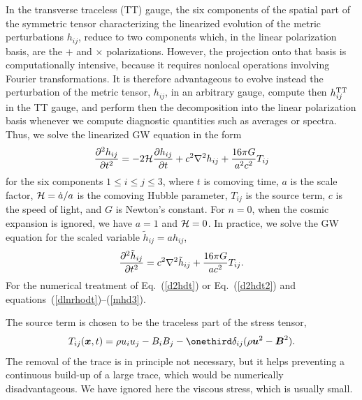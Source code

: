 \documentclass[\mydriver,12pt,twoside,notitlepage,a4paper]{article}
\renewcommand{\vec}[1]{\mbox{\boldmath{$#1$}}}
\newcommand{\Bv}            {\vec{B}}
\newcommand{\uv}            {\vec{u}}
\newcommand{\xv}            {\vec{x}}
\newcommand{\Eq}[1]{Eq.~(\ref{#1})}
\begin{document}
In the transverse traceless (TT) gauge, the six components of the
spatial part of the symmetric tensor characterizing the linearized
evolution of the metric perturbations $h_{ij}$,
reduce to two components which, in the linear polarization
basis, are the $+$ and $\times$ polarizations.
However, the projection onto that basis is computationally intensive,
because it requires nonlocal operations involving Fourier transformations.
It is therefore advantageous to evolve instead the perturbation of the metric
tensor, $h_{ij}$, in an arbitrary gauge, compute then $h_{ij}^{\rm TT}$ in
the TT gauge, and perform then the decomposition into the linear polarization
basis whenever we compute diagnostic quantities such as averages or spectra.
Thus, we solve the linearized GW equation in the form \cite{Dur08}
\begin{equation}
{\partial^2h_{ij}\over\partial t^2}
=-2{\cal H}{\partial h_{ij}\over\partial t}
+c^2\nabla^2h_{ij}+{16\pi G\over a^2 c^2} T_{ij}
\label{d2hdt}
\end{equation}
for the six components $1\leq i\leq j\leq3$, where $t$ is comoving time,
$a$ is the scale factor, ${\cal H}=\dot{a}/a$ is the comoving Hubble
parameter, $T_{ij}$ is the source term, $c$ is the speed of light,
and $G$ is Newton's constant.
For $n=0$, when the cosmic expansion is ignored, we have $a=1$ and
${\cal H}=0$.
In practice, we solve the GW equation for the scaled variable
$\tilde{h}_{ij}=ah_{ij}$,
\begin{equation}
{\partial^2\tilde{h}_{ij}\over\partial t^2}
=c^2\nabla^2\tilde{h}_{ij}+{16\pi G\over a c^2} T_{ij}.
\label{d2hdt2}
\end{equation}
For the numerical treatment of \Eq{d2hdt} or \Eq{d2hdt2} and
equations~(\ref{dlnrhodt})--(\ref{mhd3}).

The source term is chosen to be the traceless part of the stress tensor,
\begin{equation}
T_{ij}(\xv,t)=\rho u_i u_j - B_i B_j
- \onethird\delta_{ij}(\rho\uv^2-\Bv^2).
\end{equation}
The removal of the trace is in principle not necessary, but it helps
preventing a continuous build-up of a large trace, which would be
numerically disadvantageous.
We have ignored here the viscous stress, which is usually small.
\end{document}
